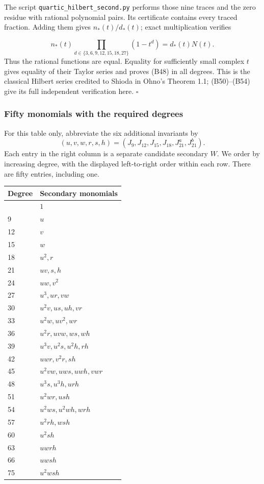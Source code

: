 \documentclass[
]{article}
\newcounter{none} %
\begin{document}
The script \texttt{quartic\_hilbert\_second.py} performs those nine
traces and the zero residue with rational polynomial pairs. Its
certificate contains every traced fraction. Adding them gives
\(n_*(t)/d_*(t)\); exact multiplication verifies
\protect{}\label{equation-B54}{}

\[
n_*(t)\prod_{d\in\{3,6,9,12,15,18,27\}}(1-t^d)
=d_*(t)N(t).
\tag{B54}
\] Thus the rational functions are equal. Equality for sufficiently
small complex \(t\) gives equality of their Taylor series and proves
(B48) in all degrees. This is the classical Hilbert series credited to
Shioda in Ohno's Theorem 1.1; (B50)--(B54) give its full independent
verification here. \(\square\)

\subsubsection{Fifty monomials with the required
degrees}\label{fifty-monomials-with-the-required-degrees}

For this table only, abbreviate the six additional invariants by \[
(u,v,w,r,s,h)=(J_9,J_{12},J_{15},J_{18},J_{21}^{a},J_{21}^{b}).
\] Each entry in the right column is a separate candidate secondary
\(W\). We order by increasing degree, with the displayed left-to-right
order within each row. There are fifty entries, including one.

{\def\LTcaptype{none} %
\begin{longtable}[]{@{}ll@{}}
\toprule\noalign{}
Degree & Secondary monomials \\
\midrule\noalign{}
\endhead
\bottomrule\noalign{}
\endlastfoot
0 & \(1\) \\
9 & \(u\) \\
12 & \(v\) \\
15 & \(w\) \\
18 & \(u^2,r\) \\
21 & \(uv,s,h\) \\
24 & \(uw,v^2\) \\
27 & \(u^3,ur,vw\) \\
30 & \(u^2v,us,uh,vr\) \\
33 & \(u^2w,uv^2,wr\) \\
36 & \(u^2r,uvw,ws,wh\) \\
39 & \(u^3v,u^2s,u^2h,rh\) \\
42 & \(uwr,v^2r,sh\) \\
45 & \(u^2vw,uws,uwh,vwr\) \\
48 & \(u^3s,u^3h,urh\) \\
51 & \(u^2wr,ush\) \\
54 & \(u^2ws,u^2wh,wrh\) \\
57 & \(u^2rh,wsh\) \\
60 & \(u^2sh\) \\
63 & \(uwrh\) \\
66 & \(uwsh\) \\
75 & \(u^2wsh\) \\
\end{longtable}
}
\end{document}
